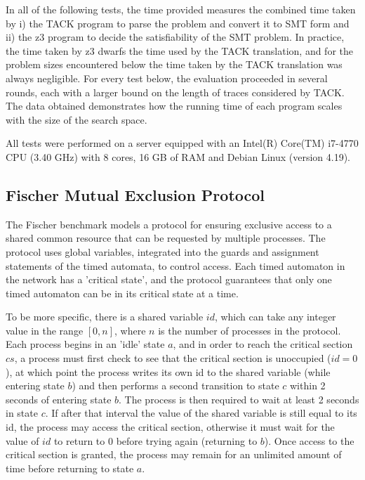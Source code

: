 \documentclass[a4paper,12pt]{article}
\begin{document}
In all of the following tests, the time provided measures the combined time
taken by i) the TACK program to parse the problem and convert it to SMT form and
ii) the z3 program to decide the satisfiability of the SMT problem. In practice,
the time taken by z3 dwarfs the time used by the TACK translation, and for the
problem sizes encountered below the time taken by the TACK translation was always
negligible. For every test below, the evaluation proceeded in several rounds,
each with a larger bound on the length of traces considered by TACK. The data
obtained demonstrates how the running time of each program scales with the size
of the search space.

All tests were performed on a server equipped with an Intel(R) Core(TM) i7-4770
CPU (3.40 GHz) with 8 cores, 16 GB of RAM and Debian Linux (version 4.19).



\subsection{Fischer Mutual Exclusion Protocol}
\label{sec:org8d1f675}
The Fischer benchmark models a protocol for ensuring exclusive access to a
shared common resource that can be requested by multiple processes. The protocol
uses global variables, integrated into the guards and assignment statements of
the timed automata, to control access. Each timed automaton in the network has a
'critical state', and the protocol guarantees that only one timed automaton can
be in its critical state at a time.

To be more specific, there is a shared variable \(id\), which can take any
integer value in the range \([0,n]\), where \(n\) is the number of processes in the
protocol. Each process begins in an 'idle' state \(a\), and in order to reach the
critical section \(cs\), a process must first check to see that the critical
section is unoccupied (\(id=0\)), at which point the process writes its own id to
the shared variable (while entering state \(b\)) and then performs a second
transition to state \(c\) within 2 seconds of entering state \(b\). The process is
then required to wait at least 2 seconds in state \(c\). If after that interval
the value of the shared variable is still equal to its id, the process may access
the critical section, otherwise it must wait for the value of \(id\) to return
to \(0\) before trying again (returning to \(b\)). Once access to the critical
section is granted, the process may remain for an unlimited amount of time before
returning to state \(a\).
\end{document}
